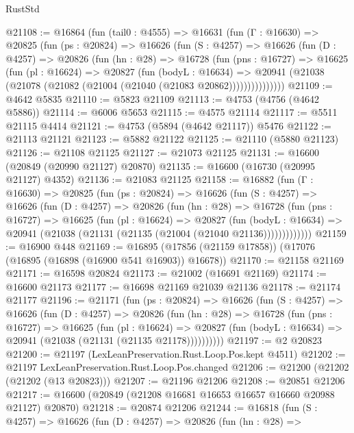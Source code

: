 \begin{lexlean}{RustStd}
\begin{coremodule}
@21108 := @16864
    (fun (tail0 : @4555) =>
    @16631
      (fun (Γ : @16630) =>
      @20825
        (fun (ps : @20824) =>
        @16626
          (fun (S : @4257) =>
          @16626
            (fun (D : @4257) =>
            @20826
              (fun (hn : @28) =>
              @16728
                (fun (pns : @16727) =>
                @16625
                  (fun (pl : @16624) =>
                  @20827
                    (fun (bodyL : @16634) =>
                    @20941 (@21038 (@21078 (@21082 (@21004 (@21040 (@21083 @20862)))))))))))))))
@21109 := @4642 @5835
@21110 := @5823 @21109
@21113 := @4753 (@4756 (@4642 @5886))
@21114 := @6006 @5653
@21115 := @4575 @21114
@21117 := @5511 @21115 @4414
@21121 := @4753 (@5894 (@4642 @21117)) @5476
@21122 := @21113 @21121
@21123 := @5882 @21122
@21125 := @21110 (@5880 @21123)
@21126 := @21108 @21125
@21127 := @21073 @21125
@21131 := @16600 (@20849 (@20990 @21127) @20870)
@21135 := @16600 (@16730 (@20995 @21127) @4352)
@21136 := @21083 @21125
@21158 := @16882
    (fun (Γ : @16630) =>
    @20825
      (fun (ps : @20824) =>
      @16626
        (fun (S : @4257) =>
        @16626
          (fun (D : @4257) =>
          @20826
            (fun (hn : @28) =>
            @16728
              (fun (pns : @16727) =>
              @16625
                (fun (pl : @16624) =>
                @20827
                  (fun (bodyL : @16634) =>
                  @20941 (@21038 (@21131 (@21135 (@21004 (@21040 @21136)))))))))))))
@21159 := @16900 @448
@21169 := @16895 (@17856 (@21159 @17858)) (@17076 (@16895 (@16898 (@16900 @541 @16903)) @16678))
@21170 := @21158 @21169
@21171 := @16598 @20824
@21173 := @21002 (@16691 @21169)
@21174 := @16600 @21173
@21177 := @16698 @21169 @21039 @21136
@21178 := @21174 @21177
@21196 := @21171
    (fun (ps : @20824) =>
    @16626
      (fun (S : @4257) =>
      @16626
        (fun (D : @4257) =>
        @20826
          (fun (hn : @28) =>
          @16728
            (fun (pns : @16727) =>
            @16625
              (fun (pl : @16624) =>
              @20827 (fun (bodyL : @16634) => @20941 (@21038 (@21131 (@21135 @21178))))))))))
@21197 := @2 @20823
@21200 := @21197 (LexLeanPreservation.Rust.Loop.Pos.kept @4511)
@21202 := @21197 LexLeanPreservation.Rust.Loop.Pos.changed
@21206 := @21200 (@21202 (@21202 (@13 @20823)))
@21207 := @21196 @21206
@21208 := @20851 @21206
@21217 := @16600 (@20849 (@21208 @16681 @16653 @16657 @16660 @20988 @21127) @20870)
@21218 := @20874 @21206
@21244 := @16818
    (fun (S : @4257) =>
    @16626
      (fun (D : @4257) =>
      @20826
        (fun (hn : @28) =>

\end{coremodule}
\end{lexlean}
